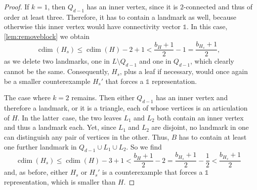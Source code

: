 \documentclass[10pt,a4paper]{amsart}
\DeclareMathOperator{\cdim}{cdim}
\begin{document}
\begin{proof}
    If $k=1$, then $Q_{d-1}$ has an inner vertex, since it is \mbox{$2$-connected} and thus of order at least three.
    Therefore, it has to contain a landmark as well, because otherwise this inner vertex would have connectivity vector $\mathds{1}$.
    In this case, \cref{lem:removeblock} we obtain
    \begin{equation*}
        \cdim(H_s)\leq\cdim(H)-2+1<\frac{b_H+1}{2}-1=\frac{b_{H_s}+1}{2},
    \end{equation*}
    as we delete two landmarks, one in $L\setminus Q_{d-1}$ and one in $Q_{d-1}$, which clearly cannot be the same. Consequently, $H_s$, plus a leaf if necessary, would once again be a smaller counterexample $H_s'$ that forces a $\mathds{1}$ representation.

    The case where $k=2$ remains.
    Then either $Q_{d-1}$ has an inner vertex and therefore a landmark, or it is a triangle, each of whose vertices is an articulation of $H$.
    In the latter~case, the two leaves $L_1$ and $L_2$ both contain an inner vertex and thus a landmark each.
    Yet, since $L_1$ and $L_2$ are disjoint, no landmark in one can distinguish any pair of vertices in the other.
    Thus, $B$ has to contain at least one further landmark in $Q_{d-1}\cup L_1\cup L_2$.
    So we find
    \begin{equation*}
        \cdim(H_s)\leq\cdim(H)-3+1<\frac{b_H+1}{2}-2=\frac{b_{H_s}+1}{2}-\frac{1}{2}<\frac{b_{H_s}+1}{2}
    \end{equation*}
    and, as before, either $H_s$ or $H_s'$ is a counterexample that forces a $\mathds{1}$ representation, which is smaller than $H$.
\end{proof}
\end{document}

